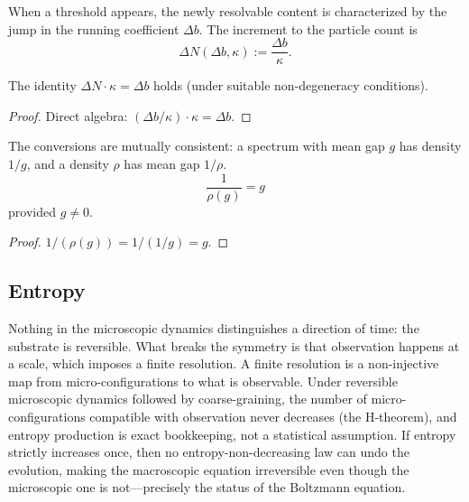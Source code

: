 \begin{definition}
When a threshold appears, the newly resolvable content is characterized by the jump in the running coefficient $\Delta b$. The increment to the particle count is
\begin{equation}
\Delta N(\Delta b, \kappa) := \frac{\Delta b}{\kappa} .
\end{equation}
\end{definition}

\begin{theorem}
The identity $\Delta N \cdot \kappa = \Delta b$ holds (under suitable non-degeneracy conditions).
\end{theorem}

\begin{proof}
Direct algebra: $({\Delta b}/{\kappa}) \cdot \kappa = \Delta b$.
\end{proof}

\begin{theorem}
The conversions are mutually consistent: a spectrum with mean gap $g$ has density $1/g$, and a density $\rho$ has mean gap $1/\rho$.
\begin{equation}
\frac{1}{\rho(g)} = g
\end{equation}
provided $g \neq 0$.
\end{theorem}

\begin{proof}
$1/(\rho(g)) = 1/(1/g) = g$.
\end{proof}

\subsection{Entropy}

Nothing in the microscopic dynamics distinguishes a direction of time: the substrate is reversible. What breaks the symmetry is that observation happens at a scale, which imposes a finite resolution. A finite resolution is a non-injective map from micro-configurations to what is observable. Under reversible microscopic dynamics followed by coarse-graining, the number of micro-configurations compatible with observation never decreases (the H-theorem), and entropy production is exact bookkeeping, not a statistical assumption. If entropy strictly increases once, then no entropy-non-decreasing law can undo the evolution, making the macroscopic equation irreversible even though the microscopic one is not—precisely the status of the Boltzmann equation.

